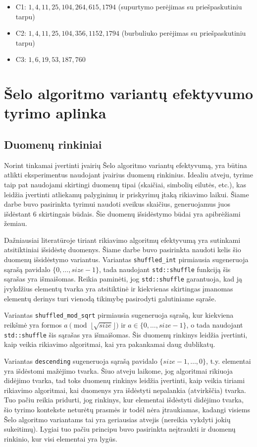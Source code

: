 \documentclass{VUMIFInfBakalaurinis}
\begin{document}
\begin{itemize}
  \item C1: $1, 4, 11, 25, 104, 264, 615, 1794$ (supurtymo perėjimas su priešpaskutiniu tarpu)
  \item C2: $1, 4, 11, 25, 104, 356, 1152, 1794$ (burbuliuko perėjimas su priešpaskutiniu tarpu)
  \item C3: $1, 6, 19, 53, 187, 760 $
\end{itemize}

\section{Šelo algoritmo variantų efektyvumo tyrimo aplinka}

\subsection{Duomenų rinkiniai}

Norint tinkamai įvertinti įvairių Šelo algoritmo variantų efektyvumą, yra būtina atlikti eksperimentus naudojant
įvairius duomenų rinkinius.
Idealiu atveju, tyrime taip pat naudojami skirtingi duomenų tipai (skaičiai, simbolių eilutės, etc.), kas leidžia įvertinti 
atliekamų palyginimų ir priskyrimų įtaką rikiavimo laikui.
Šiame darbe buvo pasirinkta tyrimui naudoti sveikus skaičius, generuojamus juos išdėstant 6 skirtingais būdais.
Šie duomenų išsidėstymo būdai yra apibrėžiami žemiau.

Dažniausiai literatūroje tiriant rikiavimo algoritmų efektyvumą yra sutinkami atsitiktiniai išsidėstę duomenys.
Šiame darbe buvo pasirinkta naudoti kelis šio duomenų išsidėstymo variantus.
Variantas \verb|shuffled_int| pirmiausia sugeneruoja sąrašą pavidalo $\{0, \dots, size-1\}$,
tada naudojant \verb|std::shuffle| funkciją šis sąrašas yra išmaišomas.
Reikia paminėti, jog \verb|std::shuffle| garantuoja, kad ją įvykdžius elementų tvarka yra atsitiktinė ir kiekvienas
skirtingas įmanomas elementų derinys turi vienodą tikimybę pasirodyti galutiniame sąraše.

Variantas \verb|shuffled_mod_sqrt| pirmiausia sugeneruoja sąrašą, kur kiekviena reikšmė yra formos $a \pmod{\lfloor \sqrt{size} \rfloor}$ ir $a \in \{0, \dots, size-1\}$,
o tada naudojant \verb|std::shuffle| šis sąrašas yra išmaišomas.
Šis duomenų rinkinys leidžia įvertinti, kaip veikia rikiavimo algoritmai, kai yra pakankamai daug dublikatų.

Variantas \verb|descending| sugeneruoja sąrašą pavidalo $\{size-1, \dots, 0 \}$,
t.y. elementai yra išdėstomi mažėjimo tvarka.
Šiuo atveju laikome, jog algoritmai rikiuoja didėjimo tvarka, tad toks duomenų rinkinys leidžia
įvertinti, kaip veikia tiriami rikiavimo algoritmai, kai duomenys yra išdėstyti nepalankia (atvirkščia) tvarka.
Tuo pačiu reikia pridurti, jog rinkinys, kur elementai išdėstyti didėjimo tvarka, šio tyrimo kontekste neturėtų prasmės ir todėl nėra įtraukiamas,
kadangi visiems Šelo algoritmo variantams tai yra geriausias atvejis (nereikia vykdyti jokių sukeitimų).
Lygiai tuo pačiu principu buvo pasirinkta neįtraukti ir duomenų rinkinio, kur visi elementai yra lygūs.
\end{document}
